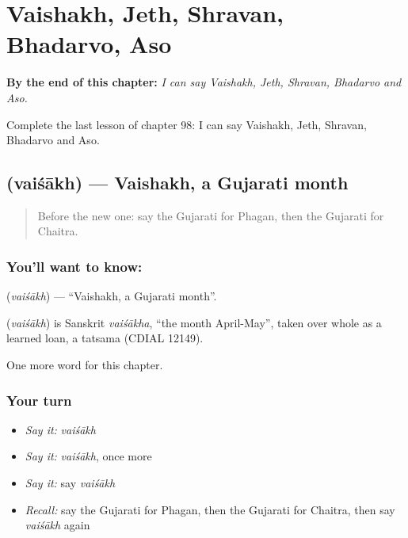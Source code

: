 
\chapter{Vaishakh, Jeth, Shravan, Bhadarvo, Aso}
\label{ch:gu-vaishakh-jeth-shravan-bhadarvo-aso}

\begin{chapteropening}
\textbf{By the end of this chapter:} \emph{I can say Vaishakh, Jeth, Shravan, Bhadarvo and Aso.}

Complete the last lesson of chapter 98: I can say Vaishakh, Jeth, Shravan, Bhadarvo and Aso.
\end{chapteropening}

\section[\texorpdfstring{\gu{વૈશાખ} (vaiśākh)}{વૈશાખ (vaiśākh)}]{ (vaiśākh) — Vaishakh, a Gujarati month}

\label{lesson:GU-C98-vaisakh}



\begin{quote}
Before the new one: say the Gujarati for Phagan, then the Gujarati for Chaitra.
\end{quote}

\subsection*{You'll want to know: }
\textbf{} (\emph{vaiśākh}) — \textquotedblleft{}Vaishakh, a Gujarati month\textquotedblright{}.

\begin{cousinweb}
\textbf{} (\emph{vaiśākh}) is Sanskrit \emph{vaiśākha}, \textquotedblleft{}the month April-May\textquotedblright{}, taken over whole as a learned loan, a tatsama (CDIAL 12149).
\end{cousinweb}

\begin{grammarlens}[title={What you've built}]
One more word for this chapter.
\end{grammarlens}

\subsection*{Your turn}
\begin{itemize}
\raggedright
  \item \emph{Say it:} \emph{vaiśākh}
  \item \emph{Say it:} \emph{vaiśākh}, once more
  \item \emph{Say it:} say \emph{vaiśākh}
  \item \emph{Recall:} say the Gujarati for Phagan, then the Gujarati for Chaitra, then say \emph{vaiśākh} again
\end{itemize}

